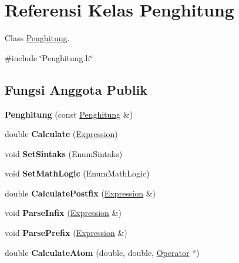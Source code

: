 \hypertarget{classPenghitung}{}\section{Referensi Kelas Penghitung}
\label{classPenghitung}


Class \hyperlink{classPenghitung}{Penghitung}.  




{\ttfamily \#include \char`\"{}Penghitung.\+h\char`\"{}}

\subsection*{Fungsi Anggota Publik}
\begin{DoxyCompactItemize}
\item 
\hypertarget{classPenghitung_a131a947d8e8271a40c06617b537719bf}{}{\bfseries Penghitung} (const \hyperlink{classPenghitung}{Penghitung} \&)\label{classPenghitung_a131a947d8e8271a40c06617b537719bf}

\item 
\hypertarget{classPenghitung_a89d5dbc2ba4990d20cbd23b8dc36e5d8}{}double {\bfseries Calculate} (\hyperlink{classExpression}{Expression})\label{classPenghitung_a89d5dbc2ba4990d20cbd23b8dc36e5d8}

\item 
\hypertarget{classPenghitung_aa47317ed3b4985c8fb59ac2695db4c56}{}void {\bfseries Set\+Sintaks} (Enum\+Sintaks)\label{classPenghitung_aa47317ed3b4985c8fb59ac2695db4c56}

\item 
\hypertarget{classPenghitung_ac810fdb8a3c14ce1eada51519830d624}{}void {\bfseries Set\+Math\+Logic} (Enum\+Math\+Logic)\label{classPenghitung_ac810fdb8a3c14ce1eada51519830d624}

\item 
\hypertarget{classPenghitung_a341680e8cf1b3d885bcf033595f124eb}{}double {\bfseries Calculate\+Postfix} (\hyperlink{classExpression}{Expression} \&)\label{classPenghitung_a341680e8cf1b3d885bcf033595f124eb}

\item 
\hypertarget{classPenghitung_a9a79a76c40718775b4e7bb0da7e398b8}{}void {\bfseries Parse\+Infix} (\hyperlink{classExpression}{Expression} \&)\label{classPenghitung_a9a79a76c40718775b4e7bb0da7e398b8}

\item 
\hypertarget{classPenghitung_acda85405d8d4a66e9b32d79d493c36d6}{}void {\bfseries Parse\+Prefix} (\hyperlink{classExpression}{Expression} \&)\label{classPenghitung_acda85405d8d4a66e9b32d79d493c36d6}

\item 
\hypertarget{classPenghitung_a286c8a27a702a9b07bbb4b226e91c815}{}double {\bfseries Calculate\+Atom} (double, double, \hyperlink{classOperator}{Operator} $\ast$)\label{classPenghitung_a286c8a27a702a9b07bbb4b226e91c815}

\end{DoxyCompactItemize}

